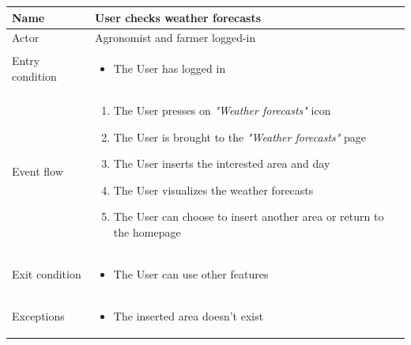 \begin{table}[H]
    \begin{tabu} to \textwidth {|X|X[4]|}
        \hline
        Name            & User checks weather forecasts           \\ \hline
        Actor           & Agronomist and farmer logged-in    \\ \hline
        Entry condition & \begin{itemize}
            \item The User has logged in
        \end{itemize} \\ \hline
        Event flow      & \begin{enumerate}
            \item The User presses on \emph{"Weather forecasts"} icon
            \item The User is brought to the \emph{"Weather forecasts"} page
            \item The User inserts the interested area and day
            \item The User visualizes the weather forecasts
            \item The User can choose to insert another area or return to the homepage
        \end{enumerate} \\ \hline
        Exit condition  & \begin{itemize}
            \item The User can use other features
        \end{itemize} \\ \hline
        Exceptions      & \begin{itemize}
            \item The inserted area doesn't exist
        \end{itemize} \\ \hline
    \end{tabu}
\end{table}

